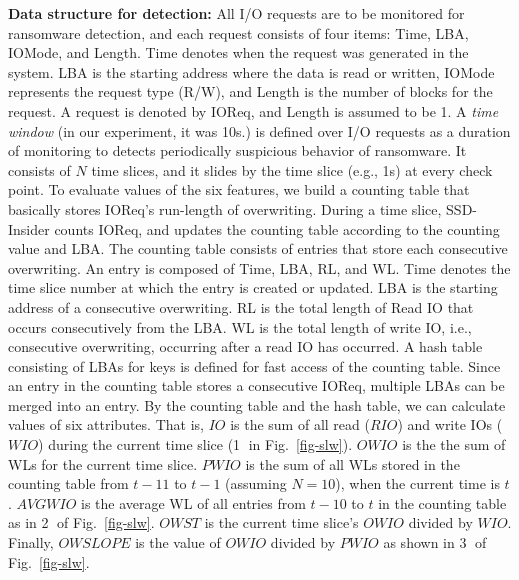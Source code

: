 \documentclass[conference]{IEEEtran}
\newcommand{\eg}{e.g.,\xspace}
\newcommand{\ours}{SSD-Insider}
\begin{document}
{\bf Data structure for detection:}
All I/O requests are to be monitored for ransomware detection, and each request consists of four items: 
Time, LBA, IOMode, and Length. Time denotes when the request was generated in the system. 
LBA is the starting address where the data is read or written, 
IOMode represents the request type (R/W), 
and Length is the number of blocks for the request. 
A request is denoted by IOReq, and Length is assumed to be 1.  
A {\em time window} (in our experiment, it was 10s.) is defined over I/O requests as a duration of monitoring
to detects periodically suspicious behavior of ransomware.
It consists of $N$ time slices, and it slides by the time slice (\eg 1s) at every check point.
To evaluate values of the six features, we build a counting table that basically stores IOReq's run-length of overwriting. 
During a time slice, \ours{} counts IOReq, and updates the counting table according to the counting value and LBA.
The counting table consists of entries that store each consecutive overwriting. 
An entry is composed of Time, LBA, RL, and WL. 
Time denotes the time slice number at which the entry is created or updated. 
LBA is the starting address of a consecutive overwriting. 
RL is the total length of Read IO that occurs consecutively from the LBA. 
WL is the total length of write IO, i.e., consecutive overwriting, occurring after a read IO has occurred. 
A hash table consisting of LBAs for keys is defined for fast access of the counting table. 
Since an entry in the counting table stores a consecutive IOReq, multiple LBAs can be merged into an entry.
By the counting table and the hash table, we can calculate values of six attributes. That is,
$IO$ is the sum of all read ($RIO$) and write IOs ($WIO$) during the current time slice 
(\textcircled{1} in Fig.~\ref{fig-slw}). 
$OWIO$ is the the sum of WLs for the current time slice. 
$PWIO$ is the sum of all WLs stored in the counting table from $t-11$ to $t-1$ (assuming $N=10$), 
when the current time is $t$. 
$AVGWIO$ is the average WL of all entries from $t-10$ to $t$ in the counting table 
as in \textcircled{2} of Fig.~\ref{fig-slw}.
$OWST$ is the current time slice's $OWIO$ divided by $WIO$. 
Finally, $OWSLOPE$ is the value of $OWIO$ divided by $PWIO$ as shown in \textcircled{3} of Fig.~\ref{fig-slw}.
\end{document}
